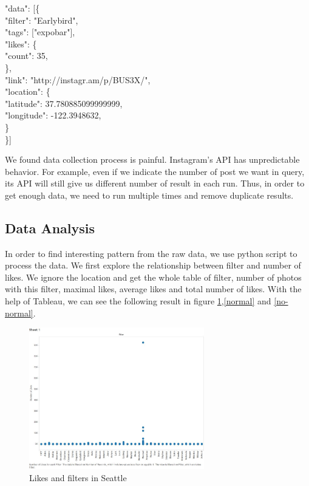 \documentclass[conference]{acmsiggraph}
\begin{document}
"data": [\{\\
\text{\quad}        "filter": "Earlybird",\\
\text{\quad}        "tags": ["expobar"],\\
\text{\quad}        "likes": \{\\
\text{\quad \quad}              "count": 35,\\
\text{\quad}        \},\\
\text{\quad}        "link": "http://instagr.am/p/BUS3X/",\\
\text{\quad}        "location": \{\\
\text{\quad \quad}            "latitude": 37.780885099999999,\\
\text{\quad \quad}            "longitude": -122.3948632,\\
\text{\quad}        \}\\
    \}]

We found data collection process is painful. Instagram's API has unpredictable behavior. For example, even if we indicate the number of post we want in query, its API will still give us different number of result in each run. Thus, in order to get enough data, we need to run multiple times and remove duplicate results.


\subsection{Data Analysis}

In order to find interesting pattern from the raw data, we use python script to process the data. We first explore the relationship between filter and number of likes. We ignore the location and get the whole table of filter, number of photos with this filter, maximal likes, average likes and total number of likes.  With the help of Tableau, we can see the following result in figure \ref{like-filter},\ref{normal} and \ref{no-normal}.


\begin{figure}[ht]
  \centering
\includegraphics[width=3in]{images/sample_all_filter-like}
  \caption{Likes and filters in Seattle}
  \label{like-filter}
\end{figure}
\end{document}
